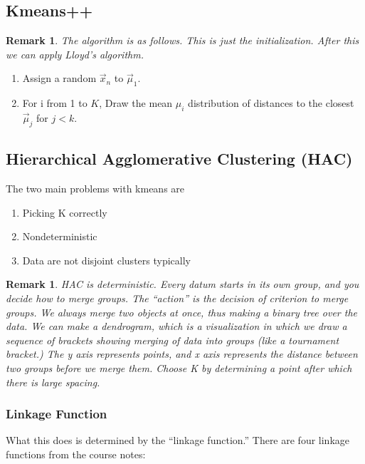 \documentclass{amsart}
\newtheorem{rem}[subsubsection]{Remark}
\begin{document}
\subsection{Kmeans++}

\begin{rem}
The algorithm is as follows. This is just the initialization. After this we can apply Lloyd's algorithm.
\end{rem}

\begin{enumerate}
\item Assign a random $\vec x_n$ to $\vec \mu_1$.
\item For i from 1 to $K$, Draw the mean $\mu_i$ distribution of distances to the closest $\vec \mu_j$ for $j < k$.
\end{enumerate}

\subsection{Hierarchical Agglomerative Clustering (HAC)}

The two main problems with kmeans are
\begin{enumerate}
\item Picking K correctly
\item Nondeterministic
\item Data are not disjoint clusters typically
\end{enumerate}

\begin{rem}
HAC is deterministic. Every datum starts in its own group, and you decide how to merge groups. The ``action'' is the decision of criterion to merge groups. We always merge two objects at once, thus making a binary tree over the data. We can make a dendrogram, which is a visualization in which we draw a sequence of brackets showing merging of data into groups (like a tournament bracket.) The y axis represents points, and x axis represents the distance between two groups before we merge them. Choose K by determining a point after which there is large spacing.
\end{rem}

\subsubsection{Linkage Function}
What this does is determined by the ``linkage function.'' There are four linkage functions from the course notes:
\end{document}
